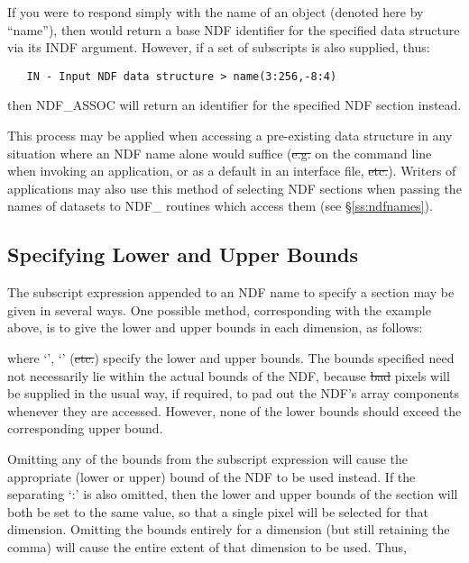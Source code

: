 If you were to respond simply with the name of an 
object (denoted here by ``name''), then  would return a base
NDF identifier for the specified data structure via its INDF
argument. However, if a set of subscripts is also supplied, thus:

\small
\begin{verbatim}
   IN - Input NDF data structure > name(3:256,-8:4)
\end{verbatim}
\normalsize

then NDF\_ASSOC will return an identifier for the specified NDF section
instead.

This process may be applied when accessing a pre-existing data
structure in any situation where an NDF name alone would suffice
(\st{e.g.\/} on the command line when invoking an application, or as a
default in an interface file, \st{etc.}). Writers of applications may
also use this method of selecting NDF sections when passing the names
of datasets to NDF\_ routines which access them (see
\S\ref{ss:ndfnames}).

\subsection{Specifying Lower and Upper Bounds}

The subscript expression appended to an NDF name to specify a section
may be given in several ways. One possible method, corresponding with
the example above, is to give the lower and upper bounds in each
dimension, as follows:

\small
\begin{quote}
\begin{center}
\end{center}
\end{quote}
\normalsize

where `', `' (\st{etc.}) specify the lower and upper bounds.
The bounds specified need not necessarily lie within the actual bounds of the
NDF, because \st{bad\/} pixels will be supplied in the usual way, if required,
to pad out the NDF's array components whenever they are accessed. However, none
of the lower bounds should exceed the corresponding upper bound.

Omitting any of the bounds from the subscript expression will cause the
appropriate (lower or upper) bound of the NDF to be used instead. If the
separating `:' is also omitted, then the lower and upper bounds of the section
will both be set to the same value, so that a single pixel will be selected for
that dimension. Omitting the bounds entirely for a dimension (but still
retaining the comma) will cause the entire extent of that dimension to be used.
Thus,


